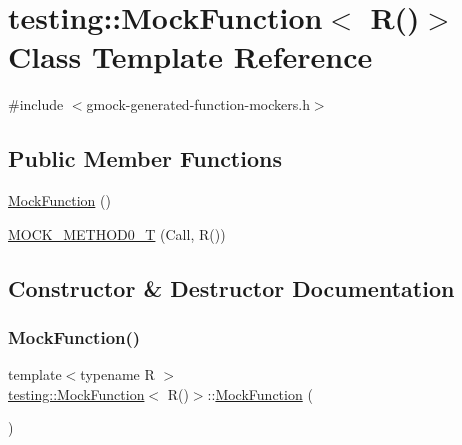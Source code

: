 \hypertarget{classtesting_1_1_mock_function_3_01_r_07_08_4}{}\section{testing\+:\+:Mock\+Function$<$ R()$>$ Class Template Reference}
\label{classtesting_1_1_mock_function_3_01_r_07_08_4}


{\ttfamily \#include $<$gmock-\/generated-\/function-\/mockers.\+h$>$}

\subsection*{Public Member Functions}
\begin{DoxyCompactItemize}
\item 
\hyperlink{classtesting_1_1_mock_function_3_01_r_07_08_4_acc6a6896f7f4b116b04e00d5a2088347}{Mock\+Function} ()
\item 
\hyperlink{classtesting_1_1_mock_function_3_01_r_07_08_4_a08e7016e3e060a5cd375b66ff0cc04e8}{M\+O\+C\+K\+\_\+\+M\+E\+T\+H\+O\+D0\+\_\+T} (Call, R())
\end{DoxyCompactItemize}


\subsection{Constructor \& Destructor Documentation}
\mbox{\label{classtesting_1_1_mock_function_3_01_r_07_08_4_acc6a6896f7f4b116b04e00d5a2088347}} 
\subsubsection{\texorpdfstring{Mock\+Function()}{MockFunction()}}
{\footnotesize\ttfamily template$<$typename R $>$ \\
\hyperlink{classtesting_1_1_mock_function}{testing\+::\+Mock\+Function}$<$ R()$>$\+::\hyperlink{classtesting_1_1_mock_function}{Mock\+Function} (\begin{DoxyParamCaption}{ }\end{DoxyParamCaption})\hspace{0.3cm}{\ttfamily [inline]}}




